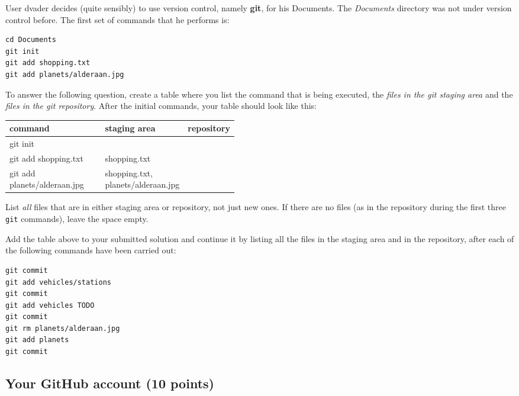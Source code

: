 \documentclass[letterpaper]{scrartcl}
\begin{document}
User dvader decides (quite sensibly) to use version control, namely
\textbf{git}, for his Documents. The \emph{Documents} directory was
not under version control before.  The first set of commands that he
performs is:
\begin{verbatim}
cd Documents
git init
git add shopping.txt
git add planets/alderaan.jpg
\end{verbatim}

To answer the following question, create a table where you list the
command that is being executed, the \emph{files in the git staging
  area} and the \emph{files in the git repository}. After the initial
commands, your table should look like this:

\begin{center}
  \small
  \begin{tabular}{lp{0.3\linewidth}p{0.15\linewidth}}
    \toprule
    command & staging area & repository\\
    \midrule
    git init & & \\
    git add shopping.txt & shopping.txt & \\
    git add planets/alderaan.jpg & shopping.txt, planets/alderaan.jpg & \\
    \bottomrule                           
  \end{tabular}
\end{center}

List \emph{all} files that are in either staging area or repository,
not just new ones. If there are no files (as in the repository during
the first three \texttt{git} commands), leave the space empty.

Add the table above to your submitted solution and continue it by
listing all the files in the staging area and in the repository, after
each of the following commands have been carried out:
\begin{verbatim}
git commit
git add vehicles/stations
git commit
git add vehicles TODO
git commit
git rm planets/alderaan.jpg
git add planets
git commit
\end{verbatim}



\subsection{Your GitHub account (10 points)}
\end{document}
